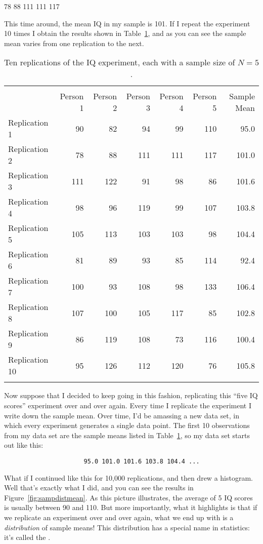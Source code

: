 \begin{rblock1}
78 88 111 111 117
\end{rblock1}

This time around, the mean IQ in my sample is 101. If I repeat the experiment 10 times I obtain the results shown in Table~\ref{tab:replications}, and as you can see the sample mean varies from one replication to the next. 

\begin{table}[t]
\centering
\caption{Ten replications of the IQ experiment, each with a sample size of $N=5$.}
\label{tab:replications}
\begin{tabular}{l|rrrrr|r}
 \multicolumn{6}{c}{} \\
 & Person 1 & Person 2 & Person 3 & Person 4 & Person 5 & Sample Mean \\ 
  \hline
Replication 1 & 90 & 82 & 94 & 99 & 110 & 95.0 \\ 
  Replication 2 & 78 & 88 & 111 & 111 & 117 & 101.0 \\ 
  Replication 3 & 111 & 122 & 91 & 98 & 86 & 101.6 \\ 
  Replication 4 & 98 & 96 & 119 & 99 & 107 & 103.8 \\ 
  Replication 5 & 105 & 113 & 103 & 103 & 98 & 104.4 \\ 
  Replication 6 & 81 & 89 & 93 & 85 & 114 & 92.4 \\ 
  Replication 7 & 100 & 93 & 108 & 98 & 133 & 106.4 \\ 
  Replication 8 & 107 & 100 & 105 & 117 & 85 & 102.8 \\ 
  Replication 9 & 86 & 119 & 108 & 73 & 116 & 100.4 \\ 
  Replication 10 & 95 & 126 & 112 & 120 & 76 & 105.8 \\ 
  \multicolumn{6}{c}{} \\
\end{tabular}
\HR
\end{table}

Now suppose that I decided to keep going in this fashion, replicating this ``five IQ scores'' experiment over and over again. Every time I replicate the experiment I write down the sample mean. Over time, I'd be amassing a new data set, in which every experiment generates a single data point. The first 10 observations from my data set are the sample means listed in Table~\ref{tab:replications}, so my data set starts out like this:
\begin{verbatim}
                      95.0 101.0 101.6 103.8 104.4 ...
\end{verbatim}
What if I continued like this for 10,000 replications, and then drew a histogram. Well that's exactly what I did, and you can see the results in Figure~\ref{fig:sampdistmean}. As this picture illustrates, the average of 5 IQ scores is usually between 90 and 110. But more importantly, what it highlights is that if we replicate an experiment over and over again, what we end up with is a {\it distribution} of sample means! This distribution has a special name in statistics: it's called the . 

